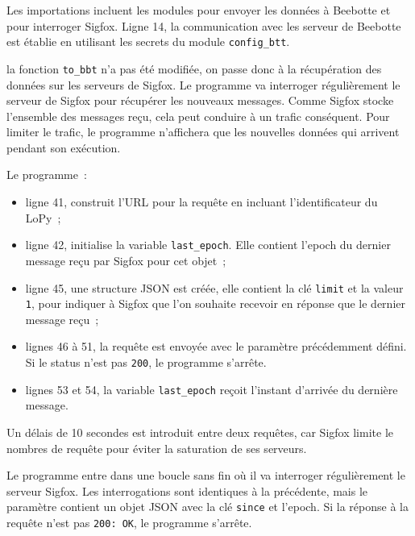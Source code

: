 
Les importations incluent les modules pour envoyer les données à Beebotte et pour interroger Sigfox. Ligne 14, la communication avec les serveur de Beebotte est établie en utilisant les secrets du module \texttt{config\_btt}.


la fonction \texttt{to\_bbt} n'a pas été modifiée, on passe donc à la récupération des données sur les serveurs de Sigfox. Le programme va interroger régulièrement le serveur de Sigfox pour récupérer les nouveaux messages. Comme Sigfox stocke l'ensemble des messages reçu, cela peut conduire à un trafic conséquent. Pour limiter le trafic, le programme n'affichera que les nouvelles données qui arrivent pendant son exécution. 

Le programme~:

\begin{itemize}
    \item ligne 41, construit l'URL pour la requête en incluant l'identificateur du LoPy~; 
    \item ligne 42, initialise la variable \texttt{last\_epoch}. Elle contient l'epoch du dernier message reçu par Sigfox pour cet objet~;
    \item ligne 45, une structure JSON est créée, elle contient la clé \texttt{limit} et la valeur \texttt{1}, pour indiquer à Sigfox que l'on souhaite recevoir en réponse que le dernier message reçu~;
    \item lignes 46 à 51, la requête est envoyée avec le paramètre précédemment défini. Si le status n'est pas \texttt{200}, le programme s'arrête.
    \item lignes 53 et 54, la variable \texttt{last\_epoch} reçoit l'instant d'arrivée du dernière message. 
\end{itemize}


Un délais de 10 secondes est introduit entre deux requêtes, car Sigfox limite le nombres de requête pour éviter la saturation de ses serveurs.



Le programme entre dans une boucle sans fin où il va interroger régulièrement le serveur Sigfox. Les interrogations sont identiques à la précédente, mais le paramètre contient un objet JSON avec la clé \texttt{since} et l'epoch. Si la réponse à la requête n'est pas \texttt{200: OK}, le programme s'arrête.


